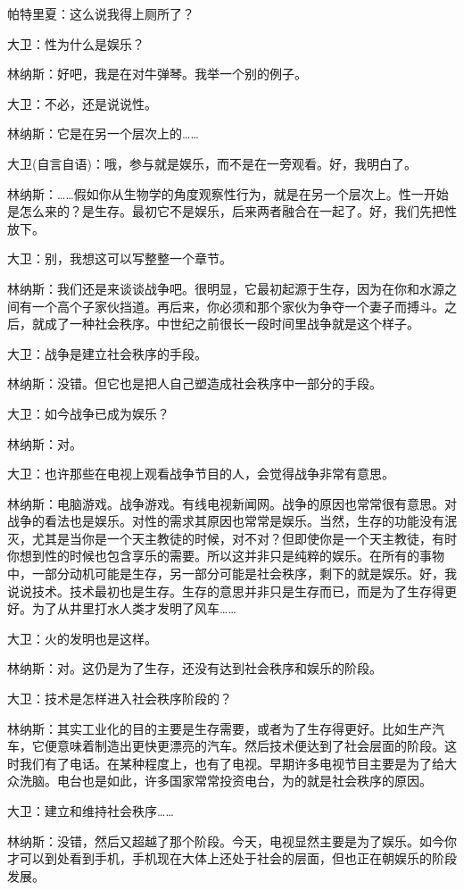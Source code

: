 \documentclass[12pt,UTF8]{ctexbook}
\begin{document}
帕特里夏：这么说我得上厕所了？

大卫：性为什么是娱乐？

林纳斯：好吧，我是在对牛弹琴。我举一个别的例子。

大卫：不必，还是说说性。

林纳斯：它是在另一个层次上的……

大卫(自言自语)：哦，参与就是娱乐，而不是在一旁观看。好，我明白了。

林纳斯：……假如你从生物学的角度观察性行为，就是在另一个层次上。性一开始是怎么来的？是生存。最初它不是娱乐，后来两者融合在一起了。好，我们先把性放下。

大卫：别，我想这可以写整整一个章节。

林纳斯：我们还是来谈谈战争吧。很明显，它最初起源于生存，因为在你和水源之间有一个高个子家伙挡道。再后来，你必须和那个家伙为争夺一个妻子而搏斗。之后，就成了一种社会秩序。中世纪之前很长一段时间里战争就是这个样子。

大卫：战争是建立社会秩序的手段。

林纳斯：没错。但它也是把人自己塑造成社会秩序中一部分的手段。

大卫：如今战争已成为娱乐？

林纳斯：对。

大卫：也许那些在电视上观看战争节目的人，会觉得战争非常有意思。

林纳斯：电脑游戏。战争游戏。有线电视新闻网。战争的原因也常常很有意思。对战争的看法也是娱乐。对性的需求其原因也常常是娱乐。当然，生存的功能没有泯灭，尤其是当你是一个天主教徒的时候，对不对？但即使你是一个天主教徒，有时你想到性的时候也包含享乐的需要。所以这并非只是纯粹的娱乐。在所有的事物中，一部分动机可能是生存，另一部分可能是社会秩序，剩下的就是娱乐。好，我说说技术。技术最初也是生存。生存的意思并非只是生存而已，而是为了生存得更好。为了从井里打水人类才发明了风车……

大卫：火的发明也是这样。

林纳斯：对。这仍是为了生存，还没有达到社会秩序和娱乐的阶段。

大卫：技术是怎样进入社会秩序阶段的？

林纳斯：其实工业化的目的主要是生存需要，或者为了生存得更好。比如生产汽车，它便意味着制造出更快更漂亮的汽车。然后技术便达到了社会层面的阶段。这时我们有了电话。在某种程度上，也有了电视。早期许多电视节目主要是为了给大众洗脑。电台也是如此，许多国家常常投资电台，为的就是社会秩序的原因。

大卫：建立和维持社会秩序……

林纳斯：没错，然后又超越了那个阶段。今天，电视显然主要是为了娱乐。如今你才可以到处看到手机，手机现在大体上还处于社会的层面，但也正在朝娱乐的阶段发展。
\end{document}
